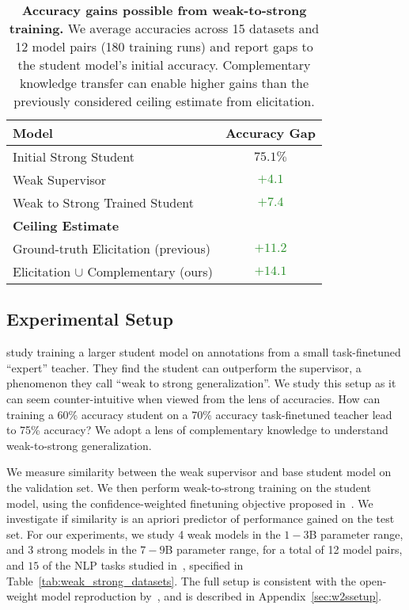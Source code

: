\begin{table}[ht]
    \centering
    \caption{\textbf{Accuracy gains possible from weak-to-strong training.} We average accuracies across 15 datasets and 12 model pairs (180 training runs) and report gaps to the student model's initial accuracy. Complementary knowledge transfer can enable higher gains than the previously considered ceiling estimate from elicitation.}
    \label{tab:w2s_accuracies}
    \begin{tabular}{@{}lc@{}}
        \toprule
        \textbf{Model} & \textbf{Accuracy Gap} \\
        \midrule
        Initial Strong Student & $75.1\%$ \\
        Weak Supervisor & \textcolor{ForestGreen}{$+4.1$} \\
        Weak to Strong Trained Student & \textcolor{ForestGreen}{$+7.4$} \\
        \midrule
        \textbf{Ceiling Estimate} & \\
        \midrule
        Ground-truth Elicitation (previous) & \textcolor{ForestGreen}{$+11.2$} \\
        Elicitation $\cup$ Complementary (ours) & \textcolor{ForestGreen}{$+14.1$} \\
        \bottomrule
    \end{tabular}
\end{table}

\subsection{Experimental Setup}

\citet{burns2024weaktostrong} study training a larger student model on annotations from a small task-finetuned ``expert'' teacher. They find the student can outperform the supervisor, a phenomenon they call ``weak to strong generalization''. We study this setup as it can seem counter-intuitive when viewed from the lens of accuracies. How can training a 60\% accuracy student on a 70\% accuracy task-finetuned teacher lead to 75\% accuracy? We adopt a lens of complementary knowledge to understand weak-to-strong generalization. 

 We measure similarity between the weak supervisor and base student model on the validation set. We then perform weak-to-strong training on the student model, using the confidence-weighted finetuning objective proposed in~\citet{burns2024weaktostrong}. We investigate if similarity is an apriori predictor of performance gained on the test set. For our experiments, we study 4 weak models in the $1-3$B parameter range, and 3 strong models in the $7-9$B parameter range, for a total of 12 model pairs, and $15$ of the NLP tasks studied in~\citet{burns2024weaktostrong}, specified in Table~\ref{tab:weak_strong_datasets}. The full setup is consistent with the open-weight model reproduction by~\citep{scherlis2024w2seleuther}, and is described in Appendix~\ref{sec:w2ssetup}. 



